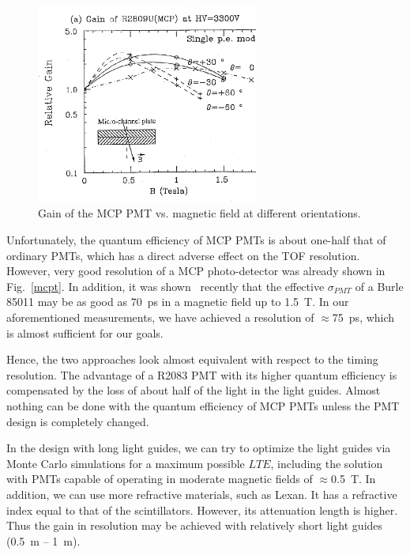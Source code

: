 \begin{figure}[htbp]
\centering
\includegraphics[width=0.65\textwidth]{fig01MC.ps}
\caption{\small{Gain of the MCP PMT vs. magnetic field at different 
orientations.}} 
\label{mcpg}
\end{figure}

Unfortunately, the quantum efficiency of MCP PMTs is about one-half that of 
ordinary PMTs, which has a direct adverse effect on the TOF resolution.
However, very good resolution of a MCP photo-detector was already shown in 
Fig.~\ref{mcpt}.  In addition, it was shown~\cite{vavra} recently that the 
effective $\sigma_{PMT}$ of a Burle 85011 may be as good as 70~ps in a 
magnetic field up to 1.5~T.  In our aforementioned measurements, we have   
achieved a resolution of $\approx$75~ps, which is almost sufficient for our 
goals.  

Hence, the two approaches look almost equivalent with respect to the timing 
resolution.  The advantage of a R2083 PMT with its higher quantum efficiency 
is compensated by the loss of about half of the light in the light guides.
Almost nothing can be done with the quantum efficiency of MCP PMTs unless the 
PMT design is completely changed.

In the design with long light guides, we can try to optimize the light guides 
via Monte Carlo simulations for a maximum possible $LTE$, including the 
solution with PMTs capable of operating in moderate magnetic fields of 
$\approx$0.5~T.  In addition, we can use more refractive materials, such as 
Lexan.  It has a refractive index equal to that of the scintillators.  However, 
its attenuation length is higher.  Thus the gain in resolution may be achieved 
with relatively short light guides (0.5~m -- 1~m).

